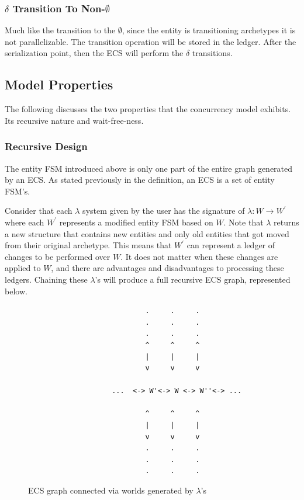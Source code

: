 \subsubsection{$\delta$ Transition To Non-$\emptyset$}
Much like the transition to the $\emptyset$, since the entity is transitioning archetypes it is not parallelizable. The transition operation will be stored in the ledger. After the serialization point, then the ECS will perform the $\delta$ transitions. 

\subsection{Model Properties}
The following discusses the two properties that the concurrency model exhibits. Its recursive nature and wait-free-ness. 

\subsubsection{Recursive Design}
\label{sec:recursive_design}
The entity FSM introduced above is only one part of the entire graph generated by an ECS. As stated previously in the definition, an ECS is a set of entity FSM's. 

Consider that each $\lambda$ system given by the user has the signature of $\lambda: W \rightarrow W^\prime$ where each $W^\prime$ represents a modified entity FSM based on $W$. Note that $\lambda$ returns a new structure that contains new entities and only old entities that got moved from their original archetype. This means that $W^\prime$ can represent a ledger of changes to be performed over $W$. It does not matter when these changes are applied to $W$, and there are advantages and disadvantages to processing these ledgers. Chaining these $\lambda$'s will produce a full recursive ECS graph, represented below.

\begin{figure}[htbp]
    \centering
    \begin{verbatim}
                            .     .     .         
                            .     .     .         
                            .     .     .         
                            ^     ^     ^         
                            |     |     |         
                            v     v     v         
                                                
                    ...  <-> W'<-> W <-> W''<-> ...
                                                
                            ^     ^     ^         
                            |     |     |         
                            v     v     v         
                            .     .     .         
                            .     .     .         
                            .     .     .         
    \end{verbatim}
    \caption{ECS graph connected via worlds generated by $\lambda$'s}
\end{figure}

